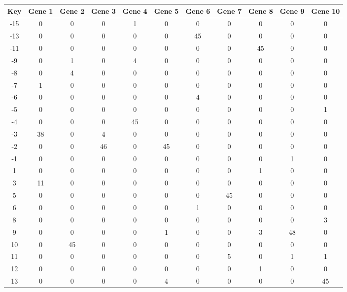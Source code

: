 \begin{tabular}{|c|c|c|c|c|c|c|c|c|c|c|}
\hline
Key & Gene 1 & Gene 2 & Gene 3 & Gene 4 & Gene 5 & Gene 6 & Gene 7 & Gene 8 & Gene 9 & Gene 10 \\
\hline
-15 & 0 & 0 & 0 & 1 & 0 & 0 & 0 & 0 & 0 & 0 \\
-13 & 0 & 0 & 0 & 0 & 0 & 45 & 0 & 0 & 0 & 0 \\
-11 & 0 & 0 & 0 & 0 & 0 & 0 & 0 & 45 & 0 & 0 \\
-9 & 0 & 1 & 0 & 4 & 0 & 0 & 0 & 0 & 0 & 0 \\
-8 & 0 & 4 & 0 & 0 & 0 & 0 & 0 & 0 & 0 & 0 \\
-7 & 1 & 0 & 0 & 0 & 0 & 0 & 0 & 0 & 0 & 0 \\
-6 & 0 & 0 & 0 & 0 & 0 & 4 & 0 & 0 & 0 & 0 \\
-5 & 0 & 0 & 0 & 0 & 0 & 0 & 0 & 0 & 0 & 1 \\
-4 & 0 & 0 & 0 & 45 & 0 & 0 & 0 & 0 & 0 & 0 \\
-3 & 38 & 0 & 4 & 0 & 0 & 0 & 0 & 0 & 0 & 0 \\
-2 & 0 & 0 & 46 & 0 & 45 & 0 & 0 & 0 & 0 & 0 \\
-1 & 0 & 0 & 0 & 0 & 0 & 0 & 0 & 0 & 1 & 0 \\
1 & 0 & 0 & 0 & 0 & 0 & 0 & 0 & 1 & 0 & 0 \\
3 & 11 & 0 & 0 & 0 & 0 & 0 & 0 & 0 & 0 & 0 \\
5 & 0 & 0 & 0 & 0 & 0 & 0 & 45 & 0 & 0 & 0 \\
6 & 0 & 0 & 0 & 0 & 0 & 1 & 0 & 0 & 0 & 0 \\
8 & 0 & 0 & 0 & 0 & 0 & 0 & 0 & 0 & 0 & 3 \\
9 & 0 & 0 & 0 & 0 & 1 & 0 & 0 & 3 & 48 & 0 \\
10 & 0 & 45 & 0 & 0 & 0 & 0 & 0 & 0 & 0 & 0 \\
11 & 0 & 0 & 0 & 0 & 0 & 0 & 5 & 0 & 1 & 1 \\
12 & 0 & 0 & 0 & 0 & 0 & 0 & 0 & 1 & 0 & 0 \\
13 & 0 & 0 & 0 & 0 & 4 & 0 & 0 & 0 & 0 & 45 \\
\hline
\end{tabular}